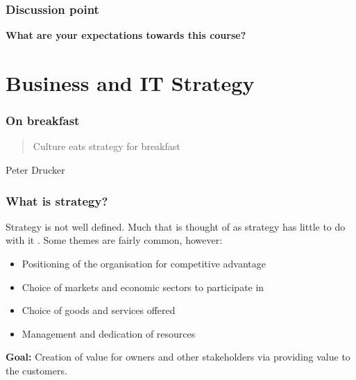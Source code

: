\begin{frame}[fragile]
  \frametitle{Discussion point}
		\begin{center}
			\textbf{What are your expectations towards this course?}
		\end{center}
\end{frame}
		
\section{Business and IT Strategy}

\begin{frame}[fragile]
  \frametitle{On breakfast}
  \begin{quote}
    Culture eats strategy for breakfast
  \end{quote}
	Peter Drucker
\end{frame}


\begin{frame}[fragile]
  \frametitle{What is strategy?}
  	Strategy is not well defined. Much that is thought of as strategy has little to do with it \citep{de2006strategy, rumelt2011good}. Some themes are fairly common, however:
	\begin{itemize}
		\item Positioning of the organisation for competitive advantage
		\item Choice of markets and economic sectors to participate in
		\item Choice of goods and services offered
		\item Management and dedication of resources
	\end{itemize}
	\textbf{Goal:} Creation of value for owners and other stakeholders via providing value to the customers.
\end{frame}



